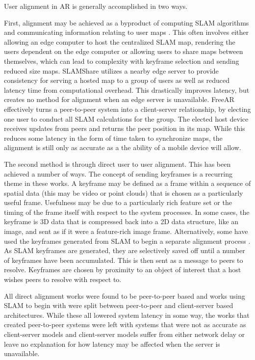 \documentclass{vgtc}                          %
\begin{document}
User alignment in AR is generally accomplished 
in two ways. 

First, alignment may be achieved as a byproduct of computing SLAM algorithms and communicating 
information relating to user maps \cite{decentralized-slam}. This often 
involves either allowing an edge computer to host the centralized SLAM map, rendering the users dependent on the 
edge computer or allowing users to share maps between themselves, which can lead to complexity with keyframe selection
and sending reduced size maps. SLAMShare\cite{SLAMShare} utilizes a nearby edge server to provide consistency for serving a hosted 
map to a group of users as well as reduced latency time from computational overhead. This drastically improves latency, but 
creates no method for alignment when an edge server is unavailable. FreeAR \cite{BreakingEdgeShackles} effectively turns a 
peer-to-peer system into a client-server relationship, by electing one user to conduct all SLAM calculations for the group. 
The elected host device receives updates from peers and returns the peer position in its map. While this reduces some latency
in the form of time taken to synchronize maps, the alignment is still only as accurate as a the ability of a mobile device will allow.

The second method is through direct user to user alignment. This has been achieved a number of ways. 
The concept of sending keyframes is a recurring theme in these works. A keyframe may be defined as a frame within a 
sequence of spatial data (this may be video or point clouds) that is chosen as a particularly useful frame. Usefulness may 
be due to a particularly rich feature set or the timing of the frame itself with respect to the system processes. In some cases,
the keyframe is 3D data that is compressed back into a 2D data structure, like an image, and sent as if it were a feature-rich 
image frame\cite{ARLight}. Alternatively, some have used the keyframes generated from SLAM to begin a separate alignment process \cite{communication-efficient-spatially-consistent}.
As SLAM keyframes are generated, they are selectively saved off until a number of keyframes have been accumulated. This is then
sent as a message to peers to resolve. Keyframes are chosen by proximity to an object of interest that a host wishes 
peers to resolve with respect to. 

All direct alignment works were found to be peer-to-peer based and works using SLAM to begin with were split between
peer-to-peer and client-server based architectures. While these all lowered system latency in some way, the works 
that created peer-to-peer systems were left with systems that were not as accurate as client-server models and client-server models 
suffer from either network delay or leave no explanation for how latency may be affected when the server is unavailable.
\end{document}
